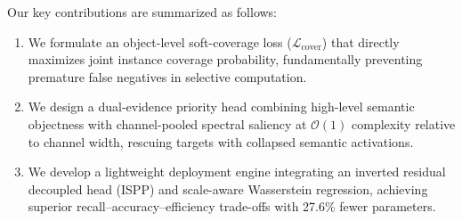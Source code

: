 Our key contributions are summarized as follows:
\begin{enumerate}
    \item We formulate an object-level soft-coverage loss ($\mathcal{L}_{\mathrm{cover}}$) that directly maximizes joint instance coverage probability, fundamentally preventing premature false negatives in selective computation.
    \item We design a dual-evidence priority head combining high-level semantic objectness with channel-pooled spectral saliency at $\mathcal{O}(1)$ complexity relative to channel width, rescuing targets with collapsed semantic activations.
    \item We develop a lightweight deployment engine integrating an inverted residual decoupled head (ISPP) and scale-aware Wasserstein regression, achieving superior recall--accuracy--efficiency trade-offs with 27.6\% fewer parameters.
\end{enumerate}
